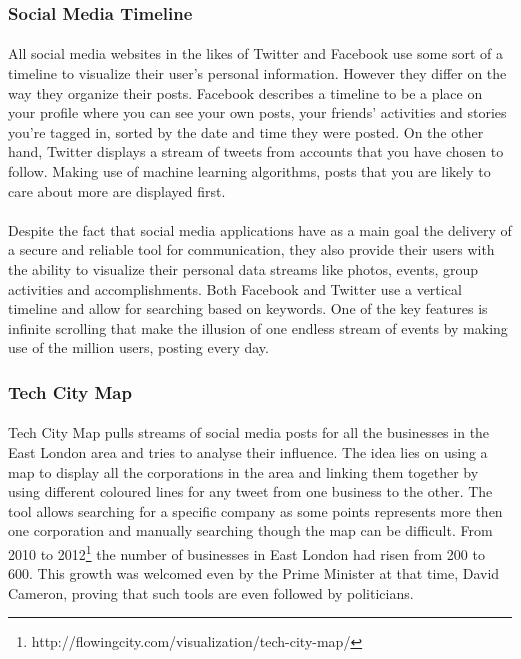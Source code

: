 \documentclass{l4proj}
\begin{document}
\subsubsection{Social Media Timeline}
\paragraph{}
All social media websites in the likes of Twitter and Facebook use some sort of a timeline to visualize their user's personal information. However they differ on the way they organize their posts. Facebook describes a timeline to be a place on your profile where you can see your own posts, your friends' activities and stories you're tagged in, sorted by the date and time they were posted. On the other hand, Twitter displays a stream of tweets from accounts that you have chosen to follow. Making use of machine learning algorithms, posts that you are likely to care about more are displayed first.
\paragraph{}
Despite the fact that social media applications have as a main goal the delivery of a secure and reliable tool for communication, they also provide their users with the ability to visualize their personal data streams like photos, events, group activities and accomplishments. Both Facebook and Twitter use a vertical timeline and allow for searching based on keywords. One of the key features is infinite scrolling that make the illusion of one endless stream of events by making use of the million users, posting every day. 

\subsubsection{Tech City Map}
\paragraph{}
Tech City Map pulls streams of social media posts for all the businesses in the East London area and tries to analyse their influence. The idea lies on using a map to display all the corporations in the area and linking them together by using different coloured lines for any tweet from one business to the other. The tool allows searching for a specific company as some points represents more then one corporation and manually searching though the map can be difficult. From 2010 to 2012\footnote{http://flowingcity.com/visualization/tech-city-map/} the number of businesses in East London had risen from 200 to 600. This growth was welcomed even by the Prime Minister at that time, David Cameron, proving that such tools are even followed by politicians. 
\end{document}
